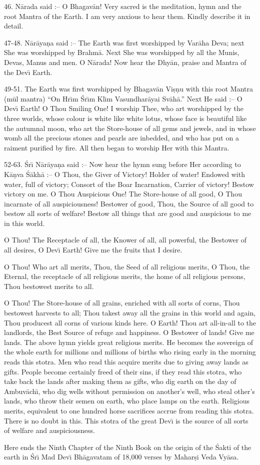 46. N\=arada said :-- O Bhagav\=an! Very sacred is the meditation, hymn and the root Mantra of the Earth. I am very anxious to hear them. Kindly describe it in detail.

47-48. N\=ar\=aya\d{n}a said :-- The Earth was first worshipped by Var\=aha Deva; next She was worshipped by Brahm\=a. Next She was worshipped by all the Munis, Devas, Manus and men. O N\=arada! Now hear the Dhy\=an, praise and Mantra of the Dev\={\i} Earth.

49-51. The Earth was first worshipped by Bhagav\=an Vi\d{s}\d{n}u with this root Mantra (m\=ul mantra) ``On Hr\={\i}m \'Sr\={\i}m Kl\={\i}m Vasundhar\=ayai Sv\=ah\=a.'' Next He said :-- O Dev\={\i} Earth! O Thou Smiling One! I worship Thee, who art worshipped by the three worlds, whose colour is white like white lotus, whose face is beautiful like the autumnal moon, who art the Store-house of all gems and jewels, and in whose womb all the precious stones and pearls are inbedded, and who has put on a raiment purified by fire. All then began to worship Her with this Mantra.

52-63. \'Sr\={\i} N\=ar\=aya\d{n}a said :-- Now hear the hymn sung before Her according to K\=a\d{n}va \'S\=akh\=a :-- O Thou, the Giver of Victory! Holder of water! Endowed with water, full of victory; Consort of the Boar Incarnation, Carrier of victory! Bestow victory on me. O Thou Auspicious One! The Store-house of all good, O Thou incarnate of all auspiciousness! Bestower of good, Thou, the Source of all good to bestow all sorts of welfare! Bestow all things that are good and auspicious to me in this world.

O Thou! The Receptacle of all, the Knower of all, all powerful, the Bestower of all desires, O Dev\={\i} Earth! Give me the fruits that I desire.

O Thou! Who art all merits, Thou, the Seed of all religious merits, O Thou, the Eternal, the receptacle of all religious merits, the home of all religious persons, Thou bestowest merits to all.

O Thou! The Store-house of all grains, enriched with all sorts of corns, Thou bestowest harvests to all; Thou takest away all the grains in this world and again, Thou producest all corns of various kinds here. O Earth! Thou art all-in-all to the landlords, the Best Source of refuge and happiness. O Bestower of lands! Give me lands. The above hymn yields great religious merits. He becomes the sovereign of the whole earth for millions and millions of births who rising early in the morning reads this stotra. Men who read this acquire merits due to giving away lands as gifts. People become certainly freed of their sins, if they read this stotra, who take back the lands after making them as gifts, who dig earth on the day of Ambuv\=ach\={\i}, who dig wells without permission on another's well, who steal other's lands, who throw their semen on earth, who place lamps on the earth. Religious merits, equivalent to one hundred horse sacrifices accrue from reading this stotra. There is no doubt in this. This stotra of the great Dev\={\i} is the source of all sorts of welfare and auspiciousness.

Here ends the Ninth Chapter of the Ninth Book on the origin of the \'Sakti of the earth in \'Sr\={\i} Mad Dev\={\i} Bh\=agavatam of 18,000 verses by Mahar\d{s}i Veda Vy\=asa.



